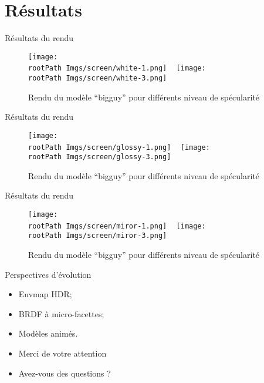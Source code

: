 \documentclass{beamer}
\newcommand*{\rootPath}{}
\begin{document}
\section{Résultats}

\begin{frame}{Résultats du rendu}
	\begin{figure}
		\centering
			\texttt{[image: \\rootPath Imgs/screen/white-1.png]}
			~
			\texttt{[image: \\rootPath Imgs/screen/white-3.png]}
		\caption{Rendu du modèle “bigguy” pour différents niveau de spécularité}
	\end{figure}
\end{frame}
\begin{frame}{Résultats du rendu}
	\begin{figure}
		\centering
			\texttt{[image: \\rootPath Imgs/screen/glossy-1.png]}
			~
			\texttt{[image: \\rootPath Imgs/screen/glossy-3.png]}
		\caption{Rendu du modèle “bigguy” pour différents niveau de spécularité}
	\end{figure}
\end{frame}
\begin{frame}{Résultats du rendu}
	\begin{figure}
		\centering
			\texttt{[image: \\rootPath Imgs/screen/miror-1.png]}
			~
			\texttt{[image: \\rootPath Imgs/screen/miror-3.png]}			
		\caption{Rendu du modèle “bigguy” pour différents niveau de spécularité}
	\end{figure}
\end{frame}

\begin{frame}{Perspectives d'évolution}
	\begin{itemize}
		\item Envmap HDR;
		\item BRDF à micro-facettes;
		\item Modèles animés.
	\end{itemize}
\end{frame}


\begin{frame}
	\begin{itemize}
		\item Merci de votre attention
		\item Avez-vous des questions ?
	\end{itemize}
\end{frame}
\end{document}

